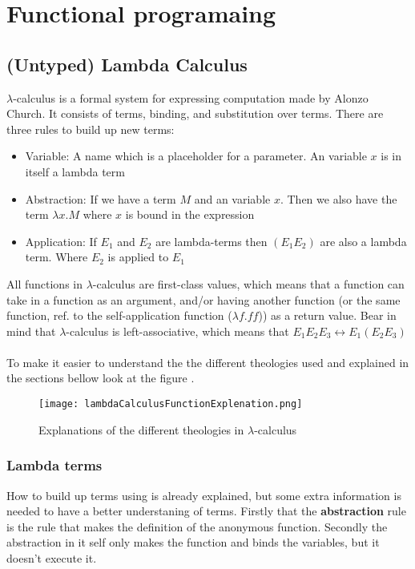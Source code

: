 \section{Functional programaing}

\subsection{(Untyped) Lambda Calculus}
\label{Lambda Calculus}
$\lambda$-calculus is a formal system for expressing computation made by Alonzo Church. It consists of terms, binding, and substitution over terms. 
There are three rules to build up new terms:

\begin{itemize}
    \item Variable: A name which  is a placeholder for a parameter. An variable $x$ is in itself a lambda term 
    \item Abstraction: If we have a term $M$ and an variable $x$. Then we also have the term $\lambda x.M$ where $x$ is bound in the expression
    \item Application: If $E_1$ and $E_2$ are lambda-terms then $(E_1 E_2) $ are also a lambda term. Where $E_2$ is applied to $E_1$
\end{itemize}
All functions in $\lambda$-calculus are first-class values, which means that a function can take in a function as an argument, and/or 
having another function (or the same function, ref. to the self-application function ($\lambda f.ff$)) as a return value.
Bear in mind that $\lambda$-calculus is left-associative, which means that $E_1 E_2 E_3 \leftrightarrow E_1 (E_2 E_3)$  
\\ \\
To make it easier to understand the the different theologies used and explained in the sections bellow look at the figure . 

\begin{figure}
    \centering
    \texttt{[image: lambdaCalculusFunctionExplenation.png]}
    \caption{Explanations of the different 
theologies in $\lambda$-calculus}
    \label{fig:LC-explenations}
\end{figure}


\subsubsection{Lambda terms}
How to build up terms using is already explained, but some extra information is needed to have a better understaning of terms. 
Firstly that the \textbf{abstraction} rule is the rule that makes the definition of the anonymous function. 
Secondly the abstraction in it self only makes the function and binds the variables, but it doesn't execute it. 

